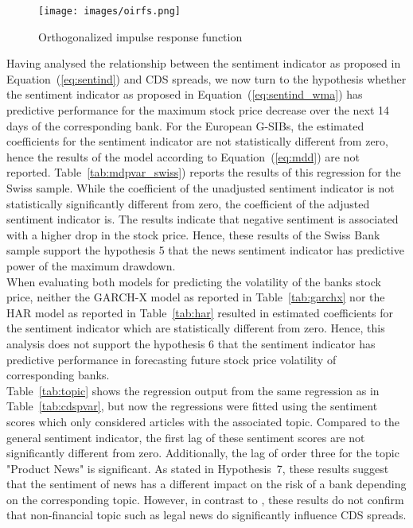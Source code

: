 \begin{figure}[H]
    \centering
    \texttt{[image: images/oirfs.png]}
    \caption{Orthogonalized impulse response function}
    \label{fig:oirfs}
\end{figure}


Having analysed the relationship between the sentiment indicator as proposed in \mbox{Equation~(\ref{eq:sentind})} and CDS spreads, we now turn to the hypothesis whether the sentiment indicator as proposed in \mbox{Equation~(\ref{eq:sentind_wma})} has predictive performance for the maximum stock price decrease over the next 14 days of the corresponding bank. For the European G-SIBs, the estimated coefficients for the sentiment indicator are not statistically different from zero, hence the results of the model according to \mbox{Equation~(\ref{eq:mdd})} are not reported. \mbox{Table~\ref{tab:mdpvar_swiss})} reports the results of this regression for the Swiss sample. While the coefficient of the unadjusted sentiment indicator is not statistically significantly different from zero, the coefficient of the adjusted sentiment indicator is. The results indicate that negative sentiment is associated with a higher drop in the stock price. Hence, these results of the Swiss Bank sample support the hypothesis 5 that the news sentiment indicator has predictive power of the maximum drawdown. \\



When evaluating both models for predicting the volatility of the banks stock price, neither the GARCH-X model as reported in \mbox{Table~\ref{tab:garchx}} nor the HAR model as reported in \mbox{Table~\ref{tab:har}} resulted in estimated coefficients for the sentiment indicator which are statistically different from zero. Hence, this analysis does not support the hypothesis 6 that the sentiment indicator has predictive performance in forecasting future stock price volatility of corresponding banks. \\





\mbox{Table~\ref{tab:topic}} shows the regression output from the same regression as in \mbox{Table~\ref{tab:cdspvar}}, but now the regressions were fitted using the sentiment scores which only considered articles with the associated topic. Compared to the general sentiment indicator, the first lag of these sentiment scores are not significantly different from zero. Additionally, the lag of order three for the topic "Product News" is significant. As stated in \mbox{Hypothesis 7}, these results suggest that the sentiment of news has a different impact on the risk of a bank depending on the corresponding topic. However, in contrast to \cite{roeder2020}, these results do not confirm that non-financial topic such as legal news do significantly influence CDS spreads.

